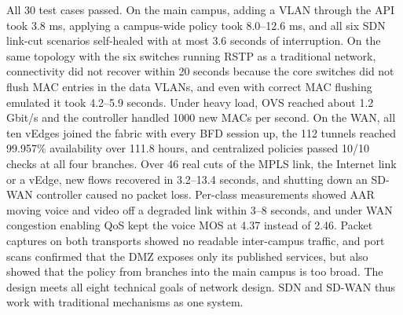 All 30 test cases passed. On the main campus, adding a VLAN through the API took 3.8 ms, applying a campus-wide policy took 8.0--12.6 ms, and all six SDN link-cut scenarios self-healed with at most 3.6 seconds of interruption. On the same topology with the six switches running RSTP as a traditional network, connectivity did not recover within 20 seconds because the core switches did not flush MAC entries in the data VLANs, and even with correct MAC flushing emulated it took 4.2--5.9 seconds. Under heavy load, OVS reached about 1.2 Gbit/s and the controller handled 1000 new MACs per second. On the WAN, all ten vEdges joined the fabric with every BFD session up, the 112 tunnels reached 99.957\% availability over 111.8 hours, and centralized policies passed 10/10 checks at all four branches. Over 46 real cuts of the MPLS link, the Internet link or a vEdge, new flows recovered in 3.2--13.4 seconds, and shutting down an SD-WAN controller caused no packet loss. Per-class measurements showed AAR moving voice and video off a degraded link within 3--8 seconds, and under WAN congestion enabling QoS kept the voice MOS at 4.37 instead of 2.46. Packet captures on both transports showed no readable inter-campus traffic, and port scans confirmed that the DMZ exposes only its published services, but also showed that the policy from branches into the main campus is too broad. The design meets all eight technical goals of network design. SDN and SD-WAN thus work with traditional mechanisms as one system.
\newpage
